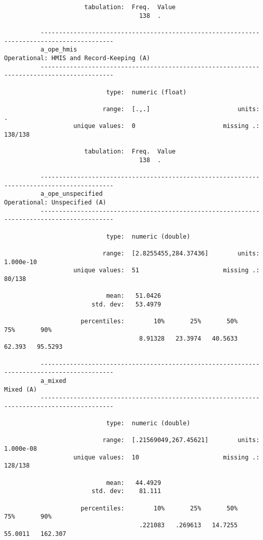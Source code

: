 \documentclass{article}
\begin{document}
\begin{verbatim}
                      tabulation:  Freq.  Value
                                     138  .
          
          ------------------------------------------------------------------------------------------
          a_ope_hmis                                        Operational: HMIS and Record-Keeping (A)
          ------------------------------------------------------------------------------------------
          
                            type:  numeric (float)
          
                           range:  [.,.]                        units:  .
                   unique values:  0                        missing .:  138/138
          
                      tabulation:  Freq.  Value
                                     138  .
          
          ------------------------------------------------------------------------------------------
          a_ope_unspecified                                             Operational: Unspecified (A)
          ------------------------------------------------------------------------------------------
          
                            type:  numeric (double)
          
                           range:  [2.8255455,284.37436]        units:  1.000e-10
                   unique values:  51                       missing .:  80/138
          
                            mean:   51.0426
                        std. dev:   53.4979
          
                     percentiles:        10%       25%       50%       75%       90%
                                     8.91328   23.3974   40.5633    62.393   95.5293
          
          ------------------------------------------------------------------------------------------
          a_mixed                                                                          Mixed (A)
          ------------------------------------------------------------------------------------------
          
                            type:  numeric (double)
          
                           range:  [.21569049,267.45621]        units:  1.000e-08
                   unique values:  10                       missing .:  128/138
          
                            mean:   44.4929
                        std. dev:    81.111
          
                     percentiles:        10%       25%       50%       75%       90%
                                     .221083   .269613   14.7255   55.0011   162.307
          
          
          
          
          
          
\end{verbatim}
\end{document}
